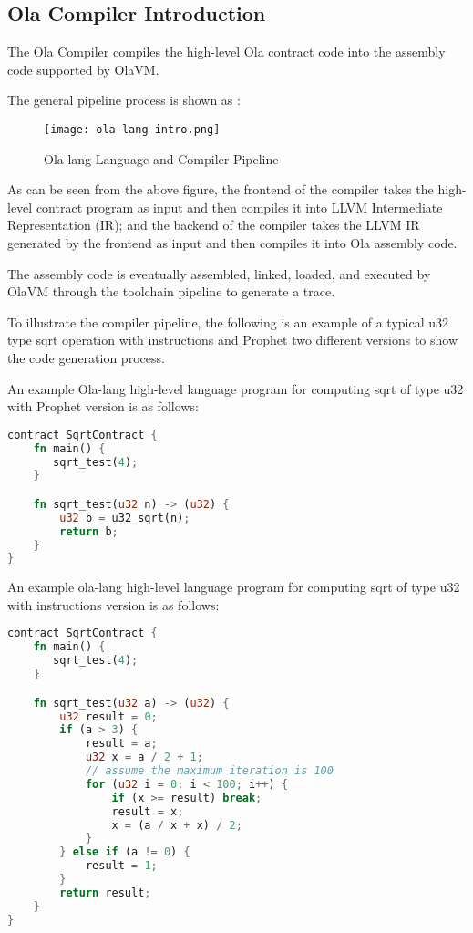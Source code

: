 \subsection{Ola Compiler Introduction}

The Ola Compiler compiles the high-level Ola contract code into the assembly code supported by OlaVM. 

The general pipeline process is shown as :

\begin{figure}[!htp]
    \centering
    \texttt{[image: ola-lang-intro.png]}
    \caption{Ola-lang Language and Compiler Pipeline}
    \label{fig:ola-lang-intro}
\end{figure}

As can be seen from the above figure, the frontend of the compiler takes the high-level contract program as input and then compiles it into LLVM Intermediate Representation (IR);
and the backend of the compiler takes the LLVM IR generated by the frontend as input and then compiles it into Ola assembly code.

The assembly code is eventually assembled, linked, loaded, and executed by OlaVM through the toolchain pipeline to generate a trace.

To illustrate the compiler pipeline, the following is an example of a typical u32 type sqrt operation with instructions and Prophet two different versions to show the code generation process.

An example Ola-lang high-level language program for computing sqrt of type u32 with Prophet version is as follows:
\begin{lstlisting}[language=rust]
contract SqrtContract {
    fn main() {
       sqrt_test(4);
    }

    fn sqrt_test(u32 n) -> (u32) {
        u32 b = u32_sqrt(n);
        return b;
    }
}
\end{lstlisting}


An example ola-lang high-level language program for computing sqrt of type u32 with instructions version is as follows:
\begin{lstlisting}[language=rust]
contract SqrtContract {
    fn main() {
       sqrt_test(4);
    }

    fn sqrt_test(u32 a) -> (u32) {
        u32 result = 0;
        if (a > 3) {
            result = a;
            u32 x = a / 2 + 1;
            // assume the maximum iteration is 100
            for (u32 i = 0; i < 100; i++) {
                if (x >= result) break;
                result = x;
                x = (a / x + x) / 2;
            }
        } else if (a != 0) {
            result = 1;
        }
        return result;
    }
}
\end{lstlisting}
